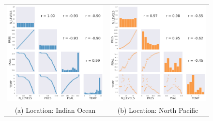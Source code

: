\documentclass[12pt]{article}
\begin{document}
\begin{figure}[!ht]
    \begin{tabular}{cc}
        \hspace{-30pt} \includegraphics[width=70mm]{correlation1.png} &\hspace{10pt}   \includegraphics[width=70mm]{correlation2.png} \\
        (a) Location: Indian Ocean & (b) Location: North Pacific \\[15pt]

\end{tabular}
\end{figure}
\end{document}
